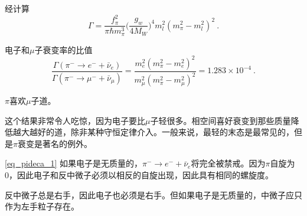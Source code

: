 经计算
\begin{equation}\label{eq_pideca_1}
\Gamma = \frac{f_\pi^2}{\pi \hbar m_\pi^3} \bigg( \frac{g_w}{4 M_W} \bigg)^4 m_l^2 (m_\pi^2 - m_l^2)^2 ~.
\end{equation}

电子和$\mu$子衰变率的比值
\begin{equation}
\frac{\Gamma(\pi^- \rightarrow e^- +\bar \nu_e)}{\Gamma(\pi^- \rightarrow \mu^- +\bar \nu_\mu)} = \frac{m_e^2(m_\pi^2-m_e^2)^2}{m_\mu^2(m_\pi^2-m_\mu^2)^2} = 1.283 \times 10^{-4}~.
\end{equation}

$\pi$喜欢$\mu$子道。

这个结果非常令人吃惊，因为电子要比$\mu$子轻很多。相空间喜好衰变到那些质量降低越大越好的道，除非某种守恒定律介入。一般来说，最轻的末态是最常见的，但是$\pi$衰变是著名的例外。

\autoref{eq_pideca_1} 如果电子是无质量的，$\pi^- \rightarrow e^-+ \bar \nu_e$将完全被禁戒。因为$\pi$自旋为0，因此电子和反中微子必须以相反的自旋出现，因此具有相同的螺旋度。

反中微子总是右手，因此电子也必须是右手。但如果电子是无质量的，中微子应只作为左手粒子存在。